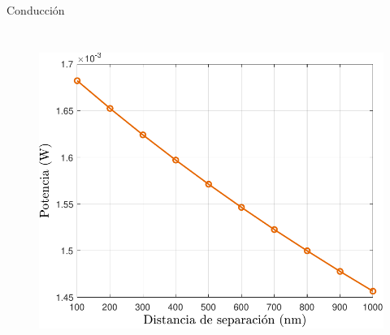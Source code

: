 \documentclass[spanish,a4paper]{beamer}%
\begin{document}
\begin{frame}{Conducción}
\begin{columns}
\begin{figure}[h]
										\includegraphics[width=\columnwidth]{Prc2_SiSiO2Ge}%
								\label{fig:SiSiO2Ge_condRc}%
						\end{figure}
						\vfill
				\end{columns}		
		\end{frame}
\end{document}
